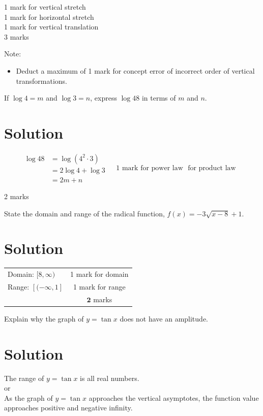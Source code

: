 \documentclass[10pt]{article}
\begin{document}
1 mark for vertical stretch\\
1 mark for horizontal stretch\\
1 mark for vertical translation\\
3 marks

Note:

\begin{itemize}
  \item Deduct a maximum of 1 mark for concept error of incorrect order of vertical transformations.
\end{itemize}

If $\log 4=m$ and $\log 3=n$, express $\log 48$ in terms of $m$ and $n$.

\section*{Solution}
$$
\begin{array}{rlr}
\log 48 & =\log \left(4^{2} \cdot 3\right) & \\
& =2 \log 4+\log 3 & \\
& =2 m+n &
\end{array} \text { 1 mark for power law } \text { for product law } \text { }
$$

2 marks

State the domain and range of the radical function, $f(x)=-3 \sqrt{x-8}+1$.

\section*{Solution}
\begin{center}
\begin{tabular}{lc}
Domain: $[8, \infty)$ & 1 mark for domain \\
Range: $[(-\infty, 1]$ & 1 mark for range \\
 & $\mathbf{2}$ marks \\
\end{tabular}
\end{center}

Explain why the graph of $y=\tan x$ does not have an amplitude.

\section*{Solution}
The range of $y=\tan x$ is all real numbers.\\
or\\
As the graph of $y=\tan x$ approaches the vertical asymptotes, the function value approaches positive and negative infinity.
\end{document}
